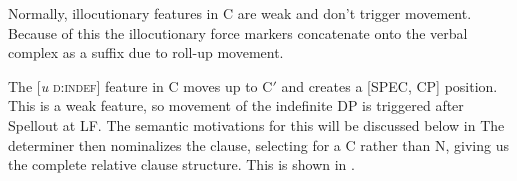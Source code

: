 \documentclass[output=paper]{LSP/langsci}
\begin{document}
\ea	\label{boyle37}
{\hspace{1em}}\newline

\z

Normally, illocutionary features in C are weak and don't trigger movement. Because of this the illocutionary force markers concatenate onto the verbal complex as a suffix due to roll-up movement.  

The [\textit{u} \textsc{d:indef}] feature in C moves up to C$'$ and creates a [SPEC, CP] position. This is a weak feature, so movement of the indefinite DP is triggered after Spellout at LF. The semantic motivations for this will be discussed below in  The determiner then nominalizes the clause, selecting for a C rather than N, giving us the complete relative clause structure. This is shown in .  

\ea	\label{boyle38}
{\hspace{1em}}\newline

\z          
      
\end{document}
